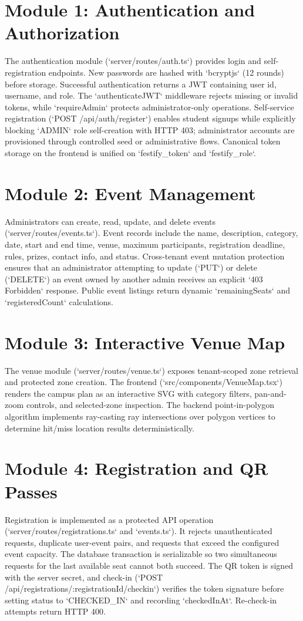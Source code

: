 \documentclass[11pt,a4paper]{report}
\begin{document}
\section{Module 1: Authentication and Authorization}
The authentication module (`server/routes/auth.ts`) provides login and self-registration endpoints. New passwords are
hashed with `bcryptjs` (12 rounds) before storage. Successful authentication returns a JWT containing
user id, username, and role. The `authenticateJWT` middleware rejects missing or
invalid tokens, while `requireAdmin` protects administrator-only operations.
Self-service registration (`POST /api/auth/register`) enables student signups while explicitly blocking `ADMIN` role self-creation with HTTP 403; administrator accounts are provisioned through controlled seed or administrative flows. Canonical token storage on the frontend is unified on `festify_token` and `festify_role`.

\section{Module 2: Event Management}
Administrators can create, read, update, and delete events (`server/routes/events.ts`). Event records include the
name, description, category, date, start and end time, venue, maximum participants,
registration deadline, rules, prizes, contact info, and status.
Cross-tenant event mutation protection ensures that an administrator attempting to update (`PUT`) or delete (`DELETE`) an event owned by another admin receives an explicit `403 Forbidden` response. Public event listings return dynamic `remainingSeats` and `registeredCount` calculations.

\section{Module 3: Interactive Venue Map}
The venue module (`server/routes/venue.ts`) exposes tenant-scoped zone retrieval and protected zone creation.
The frontend (`src/components/VenueMap.tsx`) renders the campus plan as an interactive SVG with category filters,
pan-and-zoom controls, and selected-zone inspection. The backend point-in-polygon algorithm implements ray-casting ray intersections over polygon vertices to determine hit/miss location results deterministically.

\section{Module 4: Registration and QR Passes}
Registration is implemented as a protected API operation (`server/routes/registrations.ts` and `events.ts`). It rejects unauthenticated
requests, duplicate user-event pairs, and requests that exceed the configured event
capacity. The database transaction is serializable so two simultaneous requests for the
last available seat cannot both succeed. The QR token is signed with the server secret,
and check-in (`POST /api/registrations/:registrationId/checkin`) verifies the token signature before setting status to `CHECKED_IN` and recording `checkedInAt`. Re-check-in attempts return HTTP 400.
\end{document}
